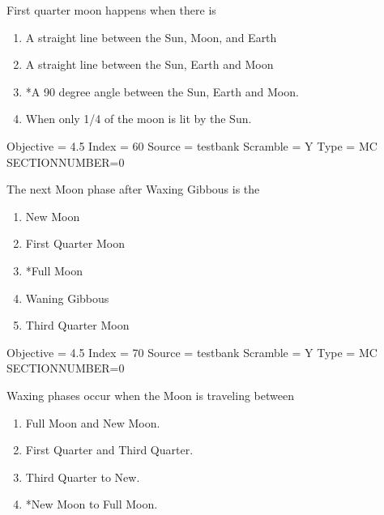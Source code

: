 \documentclass[11pt]{article}
\begin{document}
\begin{enumerate}
\begin{minipage}{\textwidth}
\begin{minipage}{\textwidth}
\item First quarter moon happens when there is
\begin{enumerate} 
\setlength{\itemsep}{1pt} 
\setlength{\parskip}{0pt} 
\setlength{\parsep}{0pt}
\setlength{\multicolsep}{1pt} 
\item A straight line between the Sun, Moon, and Earth
\item A straight line between the Sun, Earth and Moon
\item *A 90 degree angle between the Sun, Earth and Moon.
\item When only 1/4 of the moon is lit by the Sun.
\end{enumerate} 
Objective = 4.5
Index = 60
Source = testbank
Scramble = Y
Type = MC
SECTIONNUMBER=0
\end{minipage}
\end{minipage}
\vskip 0.20in

\begin{minipage}{\textwidth}
\begin{minipage}{\textwidth}
\item The next Moon phase after Waxing Gibbous is the
\begin{multicols}{3}
\begin{enumerate} 
\setlength{\itemsep}{1pt} 
\setlength{\parskip}{0pt} 
\setlength{\parsep}{0pt}
\setlength{\multicolsep}{1pt} 
\item New Moon
\item First Quarter Moon
\item *Full Moon
\item Waning Gibbous
\item Third Quarter Moon
\end{enumerate} 
\vfill 
\end{multicols}

Objective = 4.5
Index = 70
Source = testbank
Scramble = Y
Type = MC
SECTIONNUMBER=0
\end{minipage}
\end{minipage}
\vskip 0.20in

\begin{minipage}{\textwidth}
\begin{minipage}{\textwidth}
\item Waxing phases occur when the Moon is traveling between
\begin{multicols}{2}
\begin{enumerate} 
\setlength{\itemsep}{1pt} 
\setlength{\parskip}{0pt} 
\setlength{\parsep}{0pt}
\setlength{\multicolsep}{1pt} 
\item Full Moon and New Moon.
\item First Quarter and Third Quarter.
\item Third Quarter to New.
\item *New Moon to Full Moon.
\end{enumerate} 
\vfill 
\end{multicols}


\end{minipage}
\end{minipage}
\end{enumerate}
\end{document}
